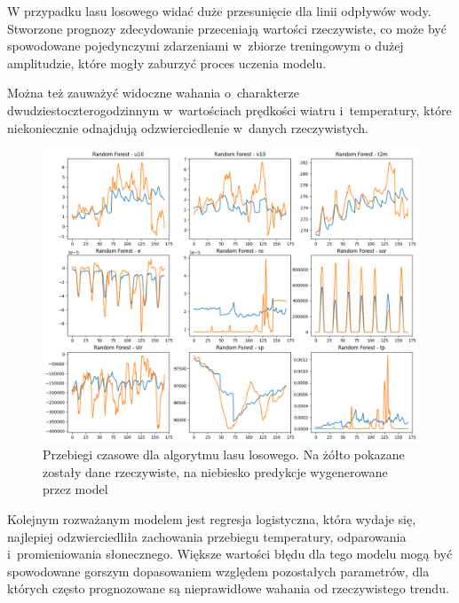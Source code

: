 W przypadku lasu losowego widać duże przesunięcie dla linii odpływów wody. Stworzone prognozy zdecydowanie
przeceniają wartości rzeczywiste, co może być spowodowane pojedynczymi zdarzeniami w~zbiorze treningowym o
dużej amplitudzie, które mogły zaburzyć proces uczenia modelu.

Można też zauważyć widoczne wahania o~charakterze dwudziestoczterogodzinnym w~wartościach 
prędkości wiatru i~temperatury, które niekoniecznie odnajdują odzwierciedlenie w~danych rzeczywistych.

\begin{figure}[H]
    \centering
    \includegraphics[width=\textwidth]{images/random_forest_week.png}
    \caption{Przebiegi czasowe dla algorytmu lasu losowego. Na żółto pokazane zostały dane 
    rzeczywiste, na niebiesko predykcje wygenerowane przez model}
    \label{forest-week}
\end{figure}

Kolejnym rozważanym modelem jest regresja logistyczna, która wydaje się, najlepiej odzwierciedliła 
zachowania przebiegu temperatury, odparowania i~promieniowania słonecznego. Większe wartości 
błędu dla tego modelu mogą być spowodowane gorszym dopasowaniem względem pozostałych parametrów, dla których
często prognozowane są nieprawidłowe wahania od rzeczywistego trendu.

